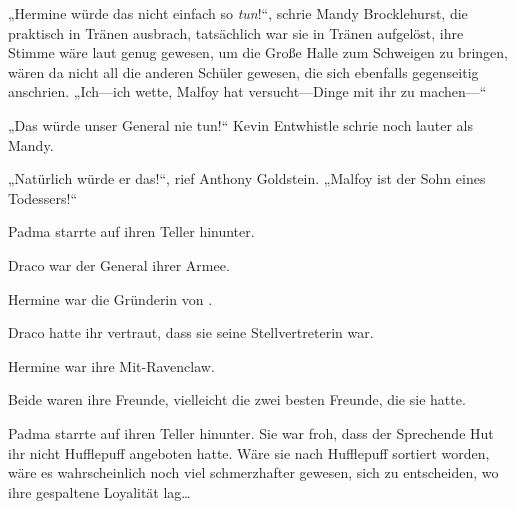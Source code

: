 „Hermine würde das nicht einfach so \emph{tun}!“, schrie Mandy Brocklehurst, die praktisch in Tränen ausbrach, tatsächlich war sie in Tränen aufgelöst, ihre Stimme wäre laut genug gewesen, um die Große Halle zum Schweigen zu bringen, wären da nicht all die anderen Schüler gewesen, die sich ebenfalls gegenseitig anschrien. „Ich—ich wette, Malfoy hat versucht—Dinge mit ihr zu machen—“

„Das würde unser General nie tun!“ Kevin Entwhistle schrie noch lauter als Mandy.

„Natürlich würde er das!“, rief Anthony Goldstein. „Malfoy ist der Sohn eines Todessers!“






Padma starrte auf ihren Teller hinunter.

Draco war der General ihrer Armee.

Hermine war die Gründerin von \SPHEW.

Draco hatte ihr vertraut, dass sie seine Stellvertreterin war.

Hermine war ihre Mit-Ravenclaw.

Beide waren ihre Freunde, vielleicht die zwei besten Freunde, die sie hatte.

Padma starrte auf ihren Teller hinunter. Sie war froh, dass der Sprechende Hut ihr nicht Hufflepuff angeboten hatte. Wäre sie nach Hufflepuff sortiert worden, wäre es wahrscheinlich noch viel schmerzhafter gewesen, sich zu entscheiden, wo ihre gespaltene Loyalität lag…

